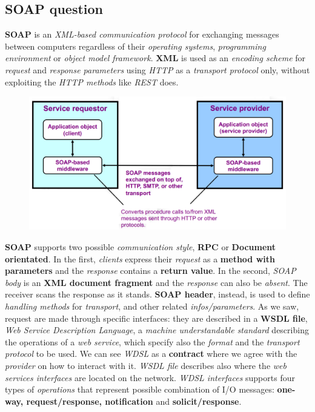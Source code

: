 \documentclass{article}
\begin{document}
\subsection{SOAP question}
\textbf{SOAP} is an \emph{XML-based communication protocol} for exchanging messages between computers regardless of their \emph{operating systems}, \emph{programming environment} or \emph{object model framework}. \textbf{XML} is used as an \emph{encoding scheme} for \emph{request} and \emph{response parameters} using \emph{HTTP} as a \emph{transport protocol} only, without exploiting the \emph{HTTP methods} like \emph{REST} does. 
\begin{figure}[H]
  \centering
  \includegraphics[scale=0.7]{cattura11.png}
\end{figure}
\hfill \break
\textbf{SOAP} supports two possible \emph{communication style}, \textbf{RPC} or \textbf{Document orientated}. In the first, \emph{clients} express their \emph{request} as a \textbf{method with parameters} and the \emph{response} contains a \textbf{return value}. In the second, \emph{SOAP body} is an \textbf{XML document fragment} and the \emph{response} can also be \emph{absent}. The receiver scans the response as it stands. \textbf{SOAP header}, instead, is used to define \emph{handling methods} for \emph{transport}, and other related \emph{infos/parameters}. As we saw, request are made through specific interfaces: they are described in a \textbf{WSDL file},\emph{ Web Service Description Language}, a \emph{machine understandable standard} describing the operations of a \emph{web service}, which specify also the \emph{format} and the \emph{transport protocol} to be used. We can see \emph{WDSL} as a \textbf{contract} where we agree with the \emph{provider} on how to interact with it. \emph{WSDL file} describes also where the \emph{web services interfaces} are located on the network.\emph{ WDSL interfaces} supports four types of \emph{operations} that represent possible combination of I/O messages: \textbf{one-way, request/response, notification} and \textbf{solicit/response}. 
\end{document}
